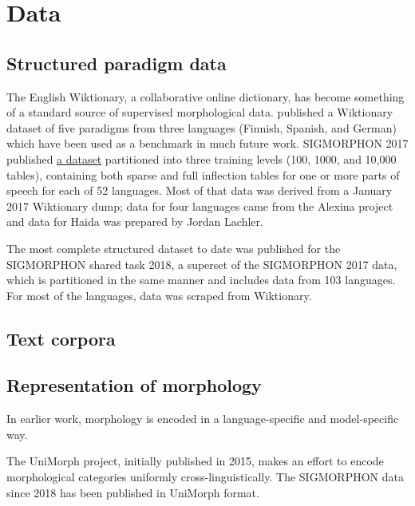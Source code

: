 \chapter{Data}

\section{Structured paradigm data}

The English Wiktionary, a collaborative online dictionary, has become something of a standard source of supervised morphological data. \cite{Durrett2013} published a Wiktionary dataset of five paradigms from three languages (Finnish, Spanish, and German) which have been used as a benchmark in much future work. \parencite{Hulden2014} \parencite{Nicolai2015} \parencite{Ahlberg2015} \parencite{Faruqui2015} SIGMORPHON 2017 published \href{https://github.com/sigmorphon/conll2017/tree/master/all}{a dataset} partitioned into three training levels (100, 1000, and 10,000 tables), containing both sparse and full inflection tables for one or more parts of speech for each of 52 languages. Most of that data was derived from a January 2017 Wiktionary dump; data for four languages came from the Alexina project and data for Haida was prepared by Jordan Lachler. \parencite{Cotterell2017} 

The most complete structured dataset to date was published for the SIGMORPHON shared task 2018, a superset of the SIGMORPHON 2017 data, which is partitioned in the same manner and includes data from 103 languages. For most of the languages, data was scraped from Wiktionary.\

\section{Text corpora}

\section{Representation of morphology}

In earlier work, morphology is encoded in a language-specific and model-specific way.

\parencite{Luong2013} The UniMorph project, initially published in 2015, makes an effort to encode morphological categories uniformly cross-linguistically. \parencite{SylakGlassman2015} \parencite{SylakGlassman2015a} \parencite{SylakGlassman2016} The SIGMORPHON data since 2018 has been published in UniMorph format.